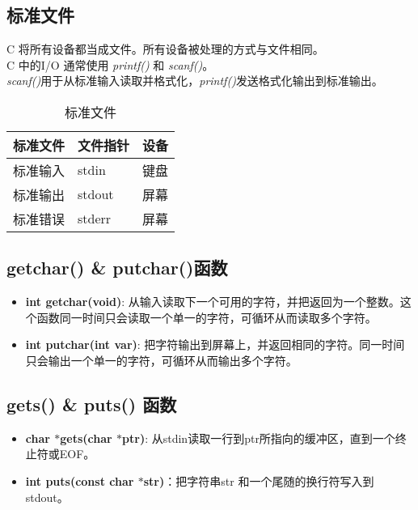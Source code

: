 \documentclass[UTF8]{ctexart}
\begin{document}
			\subsection{标准文件}
			C 将所有设备都当成文件。所有设备被处理的方式与文件相同。\\C 中的I/O 通常使用 \emph{printf()} 和 \emph{scanf()}。\\ \emph{scanf()}用于从标准输入读取并格式化，\emph{printf()}发送格式化输出到标准输出。
			\begin{table}
				\centering
				\caption{标准文件}
				\begin{tabular}[]{l|l|l}
					\toprule
					标准文件&文件指针&设备\\
					\midrule
					标准输入&stdin&键盘\\
					标准输出&stdout&屏幕\\
					标准错误&stderr&屏幕\\
					\bottomrule
				\end{tabular}
			\end{table}
			\subsection{getchar() \& putchar()函数}
			\begin{itemize}
				\item \textbf{int getchar(void)}: 从输入读取下一个可用的字符，并把返回为一个整数。这个函数同一时间只会读取一个单一的字符，可循环从而读取多个字符。
				\item \textbf{int putchar(int var)}: 把字符输出到屏幕上，并返回相同的字符。同一时间只会输出一个单一的字符，可循环从而输出多个字符。
			\end{itemize}
			\subsection{gets() \& puts() 函数}
			\begin{itemize}
				\item \textbf{char $*$gets(char $*$ptr)}: 从stdin读取一行到ptr所指向的缓冲区，直到一个终止符或EOF。
				\item \textbf{int puts(const char $*$str)}：把字符串str 和一个尾随的换行符写入到stdout。
			\end{itemize}
\end{document}
